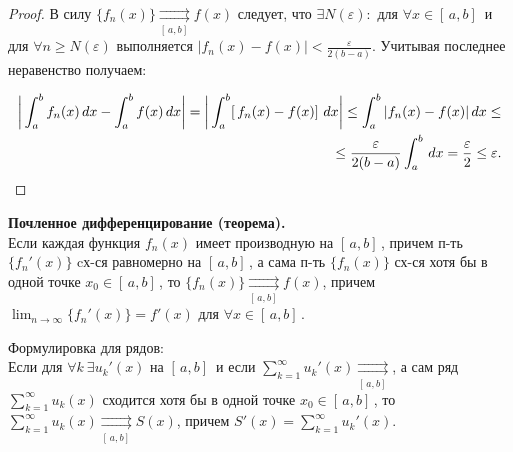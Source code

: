 \begin{proof}
В силу $\{f_n(x)\} \underset{[\,a,b]\, }{\rightrightarrows}f(x)$ следует, что $\exists N(\varepsilon):$ для $\forall x \in [\,a,b]\,$ и для $\forall n \ge N(\varepsilon)$ выполняется $|f_n(x)-f(x)| < \frac{\varepsilon}{2(b-a)}$. Учитывая последнее неравенство получаем:

\begin{align}
    \bigg|\int_{a}^{b} f_n(x) \,dx - \int_{a}^{b} f(x) \,dx\bigg| = \bigg|\int_{a}^{b} [\, f_n(x) - f(x)]\,\,dx\bigg| \le \int_{a}^{b} |f_n(x) - f(x)|\,dx \le \notag \\ 
    \le \frac{\varepsilon}{2(b-a)}\int_{a}^{b}\,dx = \frac{\varepsilon}{2} \le \varepsilon.
\end{align}

\end{proof}
\bigbreak


\textbf{Почленное дифференцирование (теорема).} \\
Если каждая функция $f_n(x)$ имеет производную на $[\,a,b]\,$, причем п-ть $\{f_n'(x)\}$ cх-ся равномерно на $[\,a,b]\,$, а сама п-ть $\{f_n(x)\}$ сх-ся хотя бы в одной точке $x_0 \in [\,a,b]\,$, то $\{f_n(x)\} \underset{[\,a,b]\, }{\rightrightarrows}f(x)$, причем $\lim_{n \rightarrow \infty}{\{f_n'(x)\}} = f'(x)$ для $\forall x \in [\,a,b]\,$.
\bigbreak

Формулировка для рядов: \\
Если для $\forall k \ \exists u_k'(x)$ на $[\,a,b]\,$ и если $\sum_{k=1}^{\infty} u_k'(x) \underset{[\,a,b]\, }{\rightrightarrows}$, а сам ряд $\sum_{k=1}^\infty u_k(x)$ сходится хотя бы в одной точке $x_0 \in [\,a,b]\,$, то $\sum_{k=1}^{\infty} u_k(x) \underset{[\,a,b]\, }{\rightrightarrows} S(x)$, причем $S'(x) = \sum_{k=1}^\infty u_k'(x)$.

